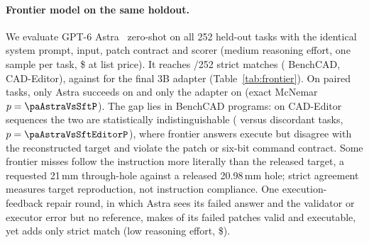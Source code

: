 \paragraph{Frontier model on the same holdout.}
We evaluate GPT-6 Astra~\cite{openai2026astra} zero-shot on all 252 held-out tasks with the identical system prompt, input, patch contract and scorer (medium reasoning effort, one sample per task, \$\paAstraCost{} at list price). It reaches \paAstra/252 strict matches (\paAstraBench{} BenchCAD, \paAstraEditor{} CAD-Editor), against \paSft{} for the final 3B adapter (Table~\ref{tab:frontier}). On paired tasks, only Astra succeeds on \paAstraOnly{} and only the adapter on \paSftOnlyVsAstra{} (exact McNemar $p=\paAstraVsSftP$). The gap lies in BenchCAD programs: on CAD-Editor sequences the two are statistically indistinguishable (\paAstraEditorOnly{} versus \paSftEditorOnly{} discordant tasks, $p=\paAstraVsSftEditorP$), where \paAstraEditorWrong{} frontier answers execute but disagree with the reconstructed target and \paAstraEditorInvalid{} violate the patch or six-bit command contract. Some frontier misses follow the instruction more literally than the released target, \eg a requested 21\,mm through-hole against a released 20.98\,mm hole; strict agreement measures target reproduction, not instruction compliance. One execution-feedback repair round, in which Astra sees its failed answer and the validator or executor error but no reference, makes \paRepairValid{} of its \paRepairTasks{} failed patches valid and \paRepairExec{} executable, yet adds only \paRepairStrict{} strict match (low reasoning effort, \$\paRepairCost).

